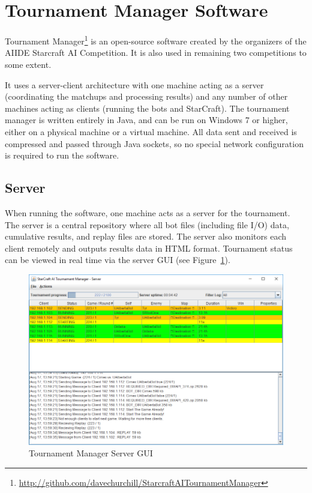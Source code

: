 \section{Tournament Manager Software}\label{secTournamentManagerSoftware}

Tournament Manager\footnote{\url{http://github.com/davechurchill/StarcraftAITournamentManager}} is an open-source software created by the organizers of the AIIDE Starcraft AI Competition. It is also used in remaining two competitions to some extent. 

It uses a server-client architecture with one machine acting as a server (coordinating the matchups and processing results) and any number of other machines acting as clients (running the bots and StarCraft). The tournament manager is written entirely in Java, and can be run on Windows 7 or higher, either on a physical machine or a virtual machine. All data sent and received is compressed and passed through Java sockets, so no special network configuration is required to run the software.

\subsection{Server}

When running the software, one machine acts as a server for the tournament. The server is a central repository where all bot files (including file I/O) data, cumulative results, and replay files are stored. The server also monitors each client remotely and outputs results data in HTML format. Tournament status can be viewed in real time via the server GUI (see Figure~\ref{tmServerGUI}). 

\begin{figure}[h]
  \centering
  \includegraphics[width=1\columnwidth]{fig/tournament-manager-screenshot.png}
  \caption{Tournament Manager Server GUI}
  \label{tmServerGUI}
\end{figure}

